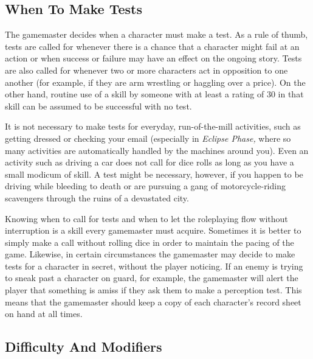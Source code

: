 \subsection{When To Make Tests}

The gamemaster decides when a character must make 
a test. As a rule of thumb, tests are called for whenever
there is a chance that a character might fail at an
action or when success or failure may have an effect 
on the ongoing story. Tests are also called for whenever
two or more characters act in opposition to one
another (for example, if they are arm wrestling or haggling
over a price). On the other hand, routine use of
a skill by someone with at least a rating of 30 in that 
skill can be assumed to be successful with no test.

It is not necessary to make tests for everyday, run-of-the-mill
activities, such as getting dressed or checking
your email (especially in \textit{Eclipse Phase,} where so
many activities are automatically handled by the machines
around you). Even an activity such as driving
a car does not call for dice rolls as long as you have 
a small modicum of skill. A test might be necessary, 
however, if you happen to be driving while bleeding 
to death or are pursuing a gang of motorcycle-riding 
scavengers through the ruins of a devastated city.

Knowing when to call for tests and when to let the 
roleplaying flow without interruption is a skill every 
gamemaster must acquire. Sometimes it is better to 
simply make a call without rolling dice in order to 
maintain the pacing of the game. Likewise, in certain 
circumstances the gamemaster may decide to make tests 
for a character in secret, without the player noticing. If 
an enemy is trying to sneak past a character on guard, 
for example, the gamemaster will alert the player that 
something is amiss if they ask them to make a perception 
test. This means that the gamemaster should keep a copy 
of each character's record sheet on hand at all times.

\subsection{Difficulty And Modifiers}

